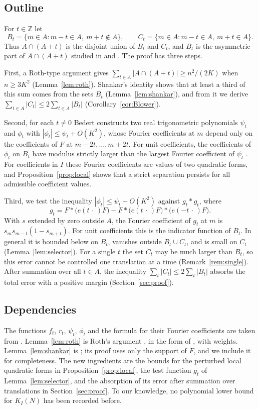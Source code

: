 \documentclass{amsart}
\theoremstyle{remark}
\numberwithin{equation}{section}
\numberwithin{table}{section}
\newcommand{\Z}{\mathbb{Z}}
\begin{document}
\subsection*{Outline}
For $t\in\Z$ let
\[
B_t=\{m\in A:m-t\in A,\ m+t\notin A\},\qquad C_t=\{m\in A:m-t\in A,\ m+t\in A\}.
\]
Thus $A\cap(A+t)$ is the disjoint union of $B_t$ and $C_t$, and $B_t$ is the asymmetric part of $A\cap(A+t)$ studied in \cite[Section~7]{Bed} and \cite{Sha}. The proof has three steps.

First, a Roth-type argument gives $\sum_{t\in A}|A\cap(A+t)|\ge n^2/(2K)$ when $n\ge3K^2$ (Lemma~\ref{lem:roth}). Shankar's identity \cite[Lemma~3.1]{Sha} shows that at least a third of this sum comes from the sets $B_t$ (Lemma~\ref{lem:shankar}), and from it we derive $\sum_{t\in A}|C_t|\le2\sum_{t\in A}|B_t|$ (Corollary~\ref{cor:Blower}).

Second, for each $t\ne0$ Bedert \cite[Section~7]{Bed} constructs two real trigonometric polynomials $\psi_t$ and $\phi_t$ with $|\phi_t|\le\psi_t+O(K^2)$, whose Fourier coefficients at $m$ depend only on the coefficients of $F$ at $m-2t,\dots,m+2t$. For unit coefficients, the coefficients of $\phi_t$ on $B_t$ have modulus strictly larger than the largest Fourier coefficient of $\psi_t$ \cite[Lemma~7.2]{Bed}. For coefficients in $I$ these Fourier coefficients are values of two quadratic forms, and Proposition~\ref{prop:local} shows that a strict separation persists for all admissible coefficient values.

Third, we test the inequality $|\phi_t|\le\psi_t+O(K^2)$ against $g_t*g_t$, where
\[
g_t=F*\bigl(e(t\,\cdot\,)F\bigr)-F*\bigl(e(t\,\cdot\,)F\bigr)*\bigl(e(-t\,\cdot\,)F\bigr).
\]
With $s$ extended by zero outside $A$, the Fourier coefficient of $g_t$ at $m$ is $s_ms_{m-t}(1-s_{m+t})$. For unit coefficients this is the indicator function of $B_t$. In general it is bounded below on $B_t$, vanishes outside $B_t\cup C_t$, and is small on $C_t$ (Lemma~\ref{lem:selector}). For a single $t$ the set $C_t$ may be much larger than $B_t$, so this error cannot be controlled one translation at a time (Remark~\ref{rem:single}). After summation over all $t\in A$, the inequality $\sum_t|C_t|\le2\sum_t|B_t|$ absorbs the total error with a positive margin (Section~\ref{sec:proof}).

\subsection*{Dependencies}
The functions $f_t$, $r_t$, $\psi_t$, $\phi_t$ and the formula for their Fourier coefficients are taken from \cite[Section~7, (36)--(41)]{Bed}. Lemma~\ref{lem:roth} is Roth's argument \cite{Rot}, in the form of \cite[Lemma~4.1]{Bed}, with weights. Lemma~\ref{lem:shankar} is \cite[Lemma~3.1]{Sha}; its proof uses only the support of $F$, and we include it for completeness. The new ingredients are the bounds for the perturbed local quadratic forms in Proposition~\ref{prop:local}, the test function $g_t$ of Lemma~\ref{lem:selector}, and the absorption of its error after summation over translations in Section~\ref{sec:proof}. To our knowledge, no polynomial lower bound for $K_I(N)$ has been recorded before.
\end{document}
